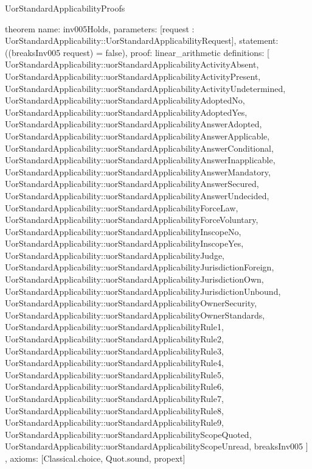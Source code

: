 \begin{lexlean}{UorStandardApplicabilityProofs}
\begin{semanticmodule}
theorem{
  name: inv005Holds,
  parameters: [request : UorStandardApplicability::UorStandardApplicabilityRequest],
  statement: ((breaksInv005 request) = false),
  proof: linear_arithmetic{
    definitions: [
      UorStandardApplicability::uorStandardApplicabilityActivityAbsent,
      UorStandardApplicability::uorStandardApplicabilityActivityPresent,
      UorStandardApplicability::uorStandardApplicabilityActivityUndetermined,
      UorStandardApplicability::uorStandardApplicabilityAdoptedNo,
      UorStandardApplicability::uorStandardApplicabilityAdoptedYes,
      UorStandardApplicability::uorStandardApplicabilityAnswerAdopted,
      UorStandardApplicability::uorStandardApplicabilityAnswerApplicable,
      UorStandardApplicability::uorStandardApplicabilityAnswerConditional,
      UorStandardApplicability::uorStandardApplicabilityAnswerInapplicable,
      UorStandardApplicability::uorStandardApplicabilityAnswerMandatory,
      UorStandardApplicability::uorStandardApplicabilityAnswerSecured,
      UorStandardApplicability::uorStandardApplicabilityAnswerUndecided,
      UorStandardApplicability::uorStandardApplicabilityForceLaw,
      UorStandardApplicability::uorStandardApplicabilityForceVoluntary,
      UorStandardApplicability::uorStandardApplicabilityInscopeNo,
      UorStandardApplicability::uorStandardApplicabilityInscopeYes,
      UorStandardApplicability::uorStandardApplicabilityJudge,
      UorStandardApplicability::uorStandardApplicabilityJurisdictionForeign,
      UorStandardApplicability::uorStandardApplicabilityJurisdictionOwn,
      UorStandardApplicability::uorStandardApplicabilityJurisdictionUnbound,
      UorStandardApplicability::uorStandardApplicabilityOwnerSecurity,
      UorStandardApplicability::uorStandardApplicabilityOwnerStandards,
      UorStandardApplicability::uorStandardApplicabilityRule1,
      UorStandardApplicability::uorStandardApplicabilityRule2,
      UorStandardApplicability::uorStandardApplicabilityRule3,
      UorStandardApplicability::uorStandardApplicabilityRule4,
      UorStandardApplicability::uorStandardApplicabilityRule5,
      UorStandardApplicability::uorStandardApplicabilityRule6,
      UorStandardApplicability::uorStandardApplicabilityRule7,
      UorStandardApplicability::uorStandardApplicabilityRule8,
      UorStandardApplicability::uorStandardApplicabilityRule9,
      UorStandardApplicability::uorStandardApplicabilityScopeQuoted,
      UorStandardApplicability::uorStandardApplicabilityScopeUnread,
      breaksInv005
    ]
  },
  axioms: [Classical.choice, Quot.sound, propext]
}
\end{semanticmodule}
\end{lexlean}
